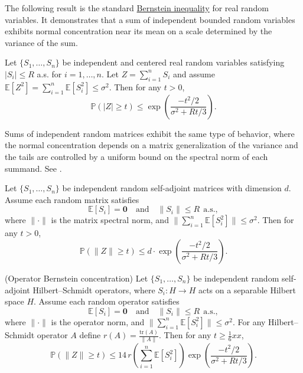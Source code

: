 The following result is the standard \href{https://en.wikipedia.org/wiki/Bernstein_inequalities_(probability_theory)}{Bernstein inequality} for real random variables. It demonstrates that a sum of independent bounded random variables exhibits normal concentration near its mean on a scale determined by the variance of the sum.

\begin{theorem} 
  Let $\{S_1, \dots, S_n\}$ be independent and centered real random variables satisfying $|S_i|\leq R$ a.s. for $i=1,\dots,n$. Let $Z=\sum_{i=1}^{n}S_i$ and assume $\mathbb{E}[Z^2]=\sum_{i=1}^{n}\mathbb{E}[S_i^2]\leq\sigma^2$. Then for any $t>0$,
\[
\mathbb{P}(|Z|\geq t) \leq \exp\!\left(\frac{-t^2/2}{\sigma^2 + Rt/3}\right).
\]
\end{theorem}



Sums of independent random matrices exhibit the same type of behavior,
where the normal concentration depends on a matrix generalization of the variance
and the tails are controlled by a uniform bound on the spectral norm of each
summand. 
See \cite{tropp2012}.

\begin{theorem}
Let $\{S_1, \dots, S_n\}$ be independent random self-adjoint matrices with dimension $d$. Assume each random matrix satisfies 
\[
\mathbb{E}[S_i] = \mathbf{0} \quad \mathrm{and} \quad
\|S_i\| \leq R \ \ \mathrm{a.s.},
\]
where $\|\cdot\|$ is the matrix spectral norm, and $\|\sum_{i=1}^{n}\mathbb{E}[S_i^2]\|\leq\sigma^2$. Then for any $t>0$,
\[
\mathbb{P}(\|Z\|\geq t) \leq d \cdot \exp\!\left(\frac{-t^2/2}{\sigma^2 + Rt/3}\right).
\]
\end{theorem}

\begin{theorem} (Operator Bernstein concentration)
Let $\{S_1, \dots, S_n\}$ be independent random self-adjoint Hilbert--Schmidt operators, where $S_i: H\rightarrow H$ acts on a separable Hilbert space $H$. Assume each random operator satisfies 
\[
\mathbb{E}[S_i] = \mathbf{0} \quad \mathrm{and} \quad
\|S_i\| \leq R \ \ \mathrm{a.s.},
\]
where $\|\cdot\|$ is the operator norm, and $\|\sum_{i=1}^{n}\mathbb{E}[S_i^2]\|\leq\sigma^2$. For any Hilbert--Schmidt operator $A$ define $r(A)=\frac{\mathrm{tr}(A)}{\|A\|}$. Then for any $t\geq \frac{1}{6}xx$,
\[
\mathbb{P}(\|Z\|\geq t) \leq 14\,r\!\left(\sum_{i=1}^{n}\mathbb{E}[S_i^2]\right) \exp\!\left(\frac{-t^2/2}{\sigma^2 + Rt/3}\right).
\]
\end{theorem}



